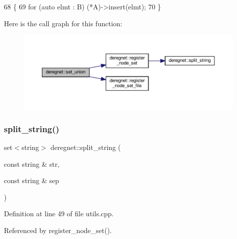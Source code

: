 \begin{DoxyCode}
68                                                   \{
69     \textcolor{keywordflow}{for} (\textcolor{keyword}{auto} elmt : B) (*A)->insert(elmt);
70 \}
\end{DoxyCode}
Here is the call graph for this function\+:\nopagebreak
\begin{figure}[H]
\begin{center}
\leavevmode
\includegraphics[width=350pt]{namespacederegnet_a387095ab9c8084306a874f51433c1dc3_cgraph}
\end{center}
\end{figure}
\mbox{\label{namespacederegnet_aa12afb18c8703a823fee68c5b9a04bca}} 
\subsubsection{\texorpdfstring{split\+\_\+string()}{split\_string()}\hspace{0.1cm}{\footnotesize\ttfamily [1/2]}}
{\footnotesize\ttfamily set$<$string$>$ deregnet\+::split\+\_\+string (\begin{DoxyParamCaption}\item[{const string \&}]{str,  }\item[{const string \&}]{sep }\end{DoxyParamCaption})}



Definition at line 49 of file utils.\+cpp.



Referenced by register\+\_\+node\+\_\+set().


